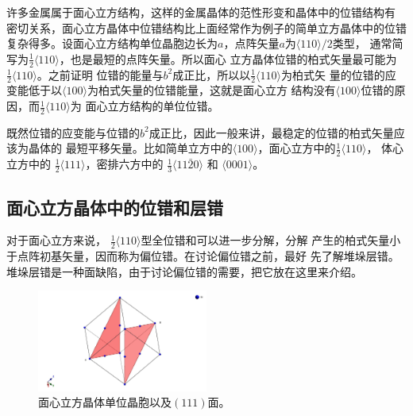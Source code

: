                 许多金属属于面心立方结构，这样的金属晶体的范性形变和晶体中的位错结构有
                密切关系，面心立方晶体中位错结构比上面经常作为例子的简单立方晶体中的位错
                复杂得多。设面心立方结构单位晶胞边长为$a$，点阵矢量$a$为$\langle110\rangle/2$类型，
                通常简写为$\frac{1}{2}\langle110\rangle$，也是最短的点阵矢量。所以面心
                立方晶体位错的柏式矢量最可能为$\frac{1}{2}\langle110\rangle$。之前证明
                位错的能量与$b^2$成正比，所以以$\frac{1}{2}\langle110\rangle$为柏式矢
                量的位错的应变能低于以$\langle100\rangle$为柏式矢量的位错能量，这就是面心立方
                结构没有$\langle100\rangle$位错的原因，而$\frac{1}{2}\langle110\rangle$为
                面心立方结构的单位位错。

                既然位错的应变能与位错的$b^2$成正比，因此一般来讲，最稳定的位错的柏式矢量应该为晶体的
                最短平移矢量。比如简单立方中的$\langle100\rangle$，面心立方中的$\frac{1}{2}\langle 110 \rangle$，
                体心立方中的 $\frac{1}{2}\langle 111 \rangle$，密排六方中的 $\frac{1}{3}\langle 11\bar{2}0 \rangle$
                和 $\langle 0001 \rangle$。

            \subsection{面心立方晶体中的位错和层错}

                对于面心立方来说， $\frac{1}{2}\langle 110 \rangle$型全位错和可以进一步分解，分解
                产生的柏式矢量小于点阵初基矢量，因而称为偏位错。在讨论偏位错之前，最好
                先了解堆垛层错。堆垛层错是一种面缺陷，由于讨论偏位错的需要，把它放在这里来介绍。

                \begin{figure}[ht]
                    \centering
                    \includegraphics[width=0.5\textwidth]{fig/fcc_111.jpeg}
                    \caption{面心立方晶体单位晶胞以及$(111)面$。}
                    \label{面心立方晶体单位晶胞以及111面}
                \end{figure}
                
